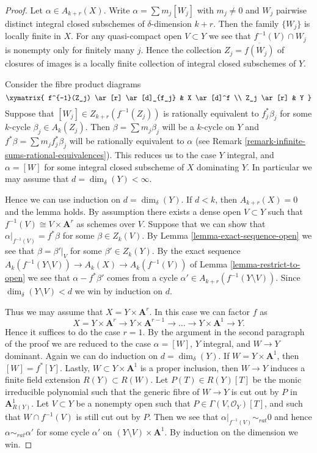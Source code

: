 \begin{proof}
Let $\alpha \in A_{k + r}(X)$.
Write $\alpha = \sum m_j[W_j]$ with $m_j \not = 0$ and
$W_j$ pairwise distinct integral closed subschemes of
$\delta$-dimension $k + r$. Then the family $\{W_j\}$
is locally finite in $X$. For any quasi-compact open
$V \subset Y$ we see that $f^{-1}(V) \cap W_j$
is nonempty only for finitely many $j$. Hence the
collection $Z_j = \overline{f(W_j)}$ of closures
of images is a locally finite collection of integral
closed subschemes of $Y$.

\medskip\noindent
Consider the fibre product diagrams
$$
\xymatrix{
f^{-1}(Z_j) \ar[r] \ar[d]_{f_j} & X \ar[d]^f \\
Z_j \ar[r] & Y
}
$$
Suppose that $[W_j] \in Z_{k + r}(f^{-1}(Z_j))$
is rationally equivalent to $f_j^*\beta_j$ for some
$k$-cycle $\beta_j \in A_k(Z_j)$. Then
$\beta = \sum m_j \beta_j$ will be a $k$-cycle on $Y$
and $f^*\beta = \sum m_j f_j^*\beta_j$ will be rationally
equivalent to $\alpha$ (see
Remark \ref{remark-infinite-sums-rational-equivalences}).
This reduces us to the case $Y$ integral, and
$\alpha = [W]$ for some integral closed subscheme
of $X$ dominating $Y$. In particular we may
assume that $d = \dim_\delta(Y) < \infty$.

\medskip\noindent
Hence we can use induction on $d = \dim_\delta(Y)$.
If $d < k$, then $A_{k + r}(X) = 0$ and the lemma holds.
By assumption there exists a dense open $V \subset Y$ such
that $f^{-1}(V) \cong V \times \mathbf{A}^r$ as schemes over $V$.
Suppose that we can show that $\alpha|_{f^{-1}(V)} = f^*\beta$
for some $\beta \in Z_k(V)$. By Lemma \ref{lemma-exact-sequence-open}
we see that
$\beta = \beta'|_V$ for some $\beta' \in Z_k(Y)$.
By the exact sequence
$A_k(f^{-1}(Y \setminus V)) \to A_k(X) \to A_k(f^{-1}(V))$
of Lemma \ref{lemma-restrict-to-open}
we see that $\alpha - f^*\beta'$ comes from
a cycle $\alpha' \in A_{k + r}(f^{-1}(Y \setminus V))$.
Since $\dim_\delta(Y \setminus V) < d$ we win by
induction on $d$.

\medskip\noindent
Thus we may assume that $X = Y \times \mathbf{A}^r$.
In this case we can factor $f$ as
$$
X = Y \times \mathbf{A}^r \to
Y \times \mathbf{A}^{r - 1} \to \ldots \to
Y \times \mathbf{A}^1 \to Y.
$$
Hence it suffices to do the case $r = 1$. By the argument in the
second paragraph of the proof we are reduced to the case
$\alpha = [W]$, $Y$ integral, and $W \to Y$ dominant.
Again we can do induction on $d = \dim_\delta(Y)$.
If $W = Y \times \mathbf{A}^1$, then $[W] = f^*[Y]$.
Lastly, $W \subset Y \times \mathbf{A}^1$ is a proper inclusion,
then $W \to Y$ induces a finite field extension $R(Y) \subset R(W)$.
Let $P(T) \in R(Y)[T]$ be the monic irreducible polynomial such
that the generic fibre of $W \to Y$ is cut out by $P$ in
$\mathbf{A}^1_{R(Y)}$. Let $V \subset Y$ be a nonempty open such
that $P \in \Gamma(V, \mathcal{O}_Y)[T]$, and such that
$W \cap f^{-1}(V)$ is still cut out by $P$. Then we see that
$\alpha|_{f^{-1}(V)} \sim_{rat} 0$ and hence $\alpha \sim_{rat} \alpha'$
for some cycle $\alpha'$ on $(Y \setminus V) \times \mathbf{A}^1$.
By induction on the dimension we win.
\end{proof}

